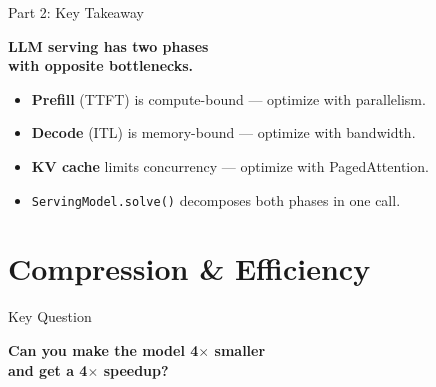 \documentclass[aspectratio=169, 12pt]{beamer}
\begin{document}
\begin{frame}{Part 2: Key Takeaway}

\centering\Large

\textbf{LLM serving has two phases\\with opposite bottlenecks.}\\[0.5cm]

\normalsize
\begin{itemize}
  \item \textbf{Prefill} (TTFT) is compute-bound --- optimize with parallelism.
  \item \textbf{Decode} (ITL) is memory-bound --- optimize with bandwidth.
  \item \textbf{KV cache} limits concurrency --- optimize with PagedAttention.
  \item \texttt{ServingModel.solve()} decomposes both phases in one call.
\end{itemize}
\end{frame}

\section{Compression \& Efficiency}

\begin{frame}{Key Question}

\centering
\Large\bfseries
Can you make the model 4$\times$ smaller\\[0.2cm]
and get a 4$\times$ speedup?
\end{frame}
\end{document}
